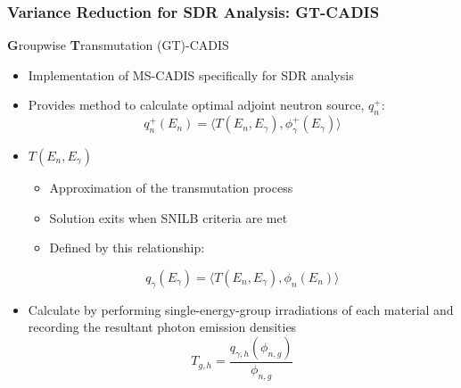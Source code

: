 \documentclass{beamer}
\begin{document}
\begin{frame}
\frametitle{Variance Reduction for SDR Analysis: GT-CADIS}
\begin{block}{\textbf{G}roupwise \textbf{T}ransmutation (GT)-CADIS}
  \begin{itemize}
  \item{Implementation of MS-CADIS specifically for SDR analysis}
  \item{Provides method to calculate optimal adjoint neutron source, $q_n^+$:}
\begin{equation}
	q^{+}_n(E_n) = \langle T(E_n, E_{\gamma}) ,
	\phi_{\gamma}^{+}(E_{\gamma}) \rangle
\end{equation}
\item{$T(E_n, E_{\gamma})$ }%
		  \begin{itemize}
			  \item{Approximation of the transmutation
				  process}
			  \item{Solution exits when SNILB criteria
				  are met}
			  \item{Defined by this relationship:}
		  \end{itemize}
\begin{equation} \label{eq:Tdef}
	q_{\gamma}(E_{\gamma}) = 
	\langle T(E_{n}, E_{\gamma}),
	\phi_{n}(E_{n}) \rangle
\end{equation}
\item{Calculate by performing single-energy-group irradiations of each
	material and recording the resultant photon emission densities}
	\begin{equation}
		T_{g,h} = \frac{q_{\gamma,h}(\phi_{n,g})}{\phi_{n,g}}
	\end{equation}

  \end{itemize}
\end{block}
%
%
		  
\end{frame}
\end{document}
